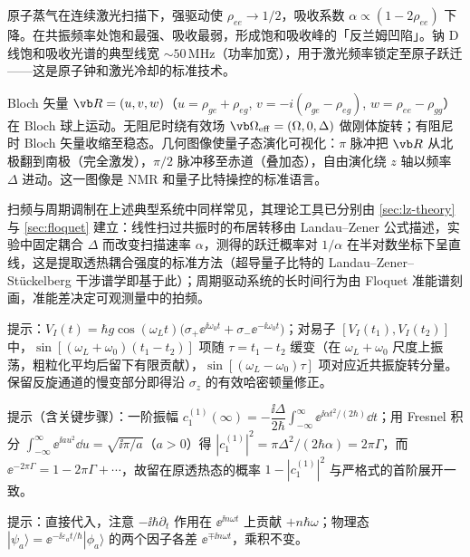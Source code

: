 原子蒸气在连续激光扫描下，强驱动使 $\rho_{ee}\to1/2$，吸收系数 $\alpha\propto(1-2\rho_{ee})$ 下降。在共振频率处饱和最强、吸收最弱，形成饱和吸收峰的「反兰姆凹陷」。钠 D 线饱和吸收光谱的典型线宽 $\sim50\,\mathrm{MHz}$（功率加宽），用于激光频率锁定至原子跃迁——这是原子钟和激光冷却的标准技术。

Bloch 矢量 $\vb R=(u,v,w)$（$u=\rho_{ge}+\rho_{eg}$, $v=-i(\rho_{ge}-\rho_{eg})$, $w=\rho_{ee}-\rho_{gg}$）在 Bloch 球上运动。无阻尼时绕有效场 $\vb\Omega_{\rm eff}=(\Omega,0,\Delta)$ 做刚体旋转；有阻尼时 Bloch 矢量收缩至稳态。几何图像使量子态演化可视化：$\pi$ 脉冲把 $\vb R$ 从北极翻到南极（完全激发），$\pi/2$ 脉冲移至赤道（叠加态），自由演化绕 $z$ 轴以频率 $\Delta$ 进动。这一图像是 NMR 和量子比特操控的标准语言。

扫频与周期调制在上述典型系统中同样常见，其理论工具已分别由 \cref{sec:lz-theory} 与 \cref{sec:floquet} 建立：线性扫过共振时的布居转移由 Landau--Zener 公式描述，实验中固定耦合 $\Delta$ 而改变扫描速率 $\alpha$，测得的跃迁概率对 $1/\alpha$ 在半对数坐标下呈直线，这是提取透热耦合强度的标准方法（超导量子比特的 Landau--Zener--St\"uckelberg 干涉谱学即基于此）；周期驱动系统的长时间行为由 Floquet 准能谱刻画，准能差决定可观测量中的拍频。


提示：$V_I(t)=\hbar g\cos(\omega_Lt)\bigl(\sigma_+\ee^{\ii\omega_0t}+\sigma_-\ee^{-\ii\omega_0t}\bigr)$；对易子 $[V_I(t_1),V_I(t_2)]$ 中，$\sin[(\omega_L+\omega_0)(t_1-t_2)]$ 项随 $\tau=t_1-t_2$ 缓变（在 $\omega_L+\omega_0$ 尺度上振荡，粗粒化平均后留下有限贡献），$\sin[(\omega_L-\omega_0)\tau]$ 项对应近共振旋转分量。保留反旋通道的慢变部分即得沿 $\sigma_z$ 的有效哈密顿量修正。


提示（含关键步骤）：一阶振幅 $c_1^{(1)}(\infty)=-\dfrac{\ii\Delta}{2\hbar}\displaystyle\int_{-\infty}^{\infty}\ee^{\ii\alpha t^2/(2\hbar)}\dd t$；用 Fresnel 积分 $\int_{-\infty}^{\infty}\ee^{\ii a u^2}\dd u=\sqrt{\ii\pi/a}$（$a>0$）得 $|c_1^{(1)}|^2=\pi\Delta^2/(2\hbar\alpha)=2\pi\Gamma$，而 $\ee^{-2\pi\Gamma}=1-2\pi\Gamma+\cdots$，故留在原透热态的概率 $1-|c_1^{(1)}|^2$ 与严格式的首阶展开一致。


提示：直接代入，注意 $-\ii\hbar\partial_t$ 作用在 $\ee^{\ii n\omega t}$ 上贡献 $+n\hbar\omega$；物理态 $|\psi_a\rangle=\ee^{-\ii\varepsilon_a t/\hbar}|\phi_a\rangle$ 的两个因子各差 $\ee^{\mp\ii n\omega t}$，乘积不变。

